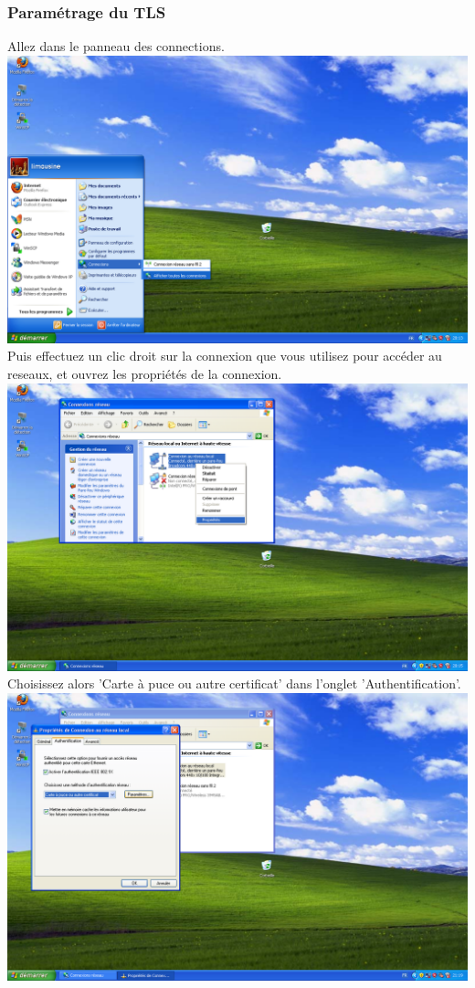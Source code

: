 \subsubsection{Paramétrage du TLS}
Allez dans le panneau des connections.\\
\includegraphics[width=\screenShotSize{}]{img/connections.PNG}\\
Puis effectuez un clic droit sur la connexion que vous utilisez pour accéder au reseaux, et ouvrez les propriétés de la connexion.\\
\includegraphics[width=\screenShotSize{}]{img/connectionProperties.PNG}\\
Choisissez alors 'Carte à puce ou autre certificat' dans l'onglet 'Authentification'.\\
\includegraphics[width=\screenShotSize{}]{img/tls.PNG}\\
